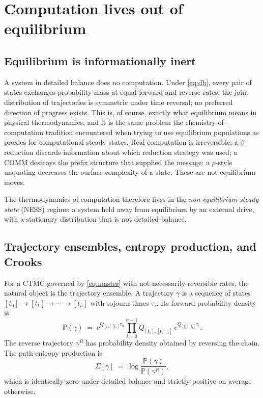 \documentclass[11pt]{article}
\theoremstyle{plain}
\theoremstyle{definition}
\theoremstyle{remark}
\newcommand{\Prob}{\mathbb{P}}
\begin{document}
\section{Computation lives out of equilibrium}\label{sec:ness}

\subsection{Equilibrium is informationally inert}

A system in detailed balance does no computation. Under \eqref{eq:db}, every pair of states exchanges probability mass at equal forward and reverse rates; the joint distribution of trajectories is symmetric under time reversal; no preferred direction of progress exists. This is, of course, exactly what equilibrium means in physical thermodynamics, and it is the same problem the chemistry-of-computation tradition encountered when trying to use equilibrium populations as proxies for computational steady states. Real computation is irreversible: a $\beta$-reduction discards information about which reduction strategy was used; a COMM destroys the prefix structure that supplied the message; a $\rho$-style unquoting decreases the surface complexity of a state. These are not equilibrium moves.

The thermodynamics of computation therefore lives in the \emph{non-equilibrium steady state} (NESS) regime: a system held away from equilibrium by an external drive, with a stationary distribution that is not detailed-balance.

\subsection{Trajectory ensembles, entropy production, and Crooks}

For a CTMC governed by \eqref{eq:master} with not-necessarily-reversible rates, the natural object is the trajectory ensemble. A trajectory $\gamma$ is a sequence of states $[t_0] \to [t_1] \to \cdots \to [t_n]$ with sojourn times $\tau_i$. Its forward probability density is
\[
\Prob(\gamma) \;=\; e^{Q_{[t_n][t_n]} \tau_n} \prod_{i=0}^{n-1} Q_{[t_i],[t_{i+1}]}\, e^{Q_{[t_i][t_i]} \tau_i}.
\]
The reverse trajectory $\gamma^R$ has probability density obtained by reversing the chain. The path-entropy production is
\[
\Sigma[\gamma] \;=\; \log \frac{\Prob(\gamma)}{\Prob(\gamma^R)},
\]
which is identically zero under detailed balance and strictly positive on average otherwise.
\end{document}
